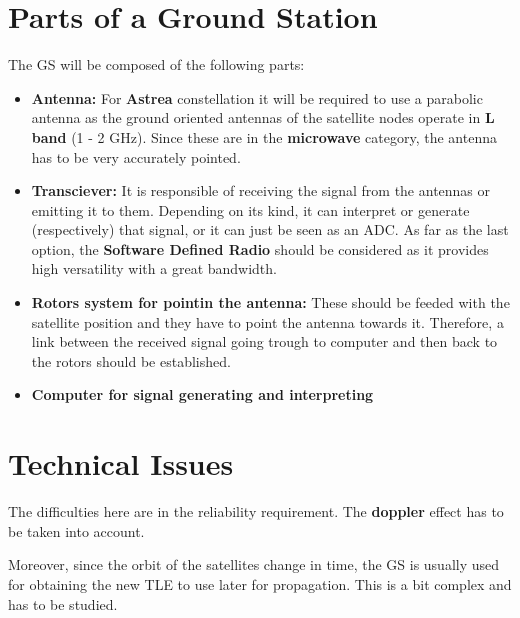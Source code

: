 \documentclass[12pt,a4paper]{article}
\begin{document}
\section{Parts of a Ground Station}
The GS will be composed of the following parts:
\begin{itemize}
\item \textbf{Antenna:} For \textbf{Astrea} constellation it will be required to use a parabolic antenna as the ground oriented antennas of the satellite nodes operate in \textbf{L band} (1 - 2 GHz). Since these are in the \textbf{microwave} category, the antenna has to be very accurately pointed.
\item \textbf{Transciever:} It is responsible of receiving the signal from the antennas or emitting it to them. Depending on its kind, it can interpret or generate (respectively) that signal, or it can just be seen as an ADC. As far as the last option, the \textbf{Software Defined Radio} should be considered as it provides high versatility with a great bandwidth.
\item \textbf{Rotors system for pointin the antenna:} These should be feeded with the satellite position and they have to point the antenna towards it. Therefore, a link between the received signal going trough to computer and then back to the rotors should be established.
\item \textbf{Computer for signal generating and interpreting}
\end{itemize}

\section{Technical Issues}
The difficulties here are in the reliability requirement. The \textbf{doppler} effect has to be taken into account.

Moreover, since the orbit of the satellites change in time, the GS is usually used for obtaining the new TLE to use later for propagation. This is a bit complex and has to be studied.
\end{document}
